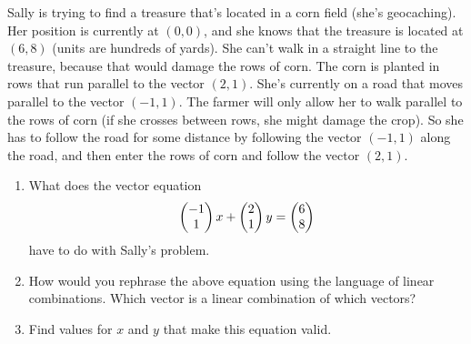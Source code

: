 \begin{problem}\label{sally in corn field with 2 directions}
Sally is trying to find a treasure that's located in a corn field (she's geocaching). 
Her position is currently at $(0,0)$, and she knows that the treasure is located at $(6,8)$ (units are hundreds of yards). 
She can't walk in a straight line to the treasure, because that would damage the rows of corn.  
The corn is planted in rows that run parallel to the vector $(2,1)$.  
She's currently on a road that moves parallel to the vector $(-1,1)$. 
The farmer will only allow her to walk parallel to the rows of corn (if she crosses between rows, she might damage the crop).  
So she has to follow the road for some distance by following the vector $(-1,1)$ along the road, and then enter the rows of corn and follow the vector $(2,1)$.
\begin{enumerate}
 \item 
What does the vector equation 
$$\begin{pmatrix} -1\\1 \end{pmatrix}x+\begin{pmatrix} 2\\1 \end{pmatrix}y=\begin{pmatrix} 6\\8 \end{pmatrix}$$ 
have to do with Sally's problem.
 \item 
How would you rephrase the above equation using the language of linear combinations.  Which vector is a linear combination of which vectors?
 \item 
Find values for $x$ and $y$ that make this equation valid.
\end{enumerate}
\end{problem}

